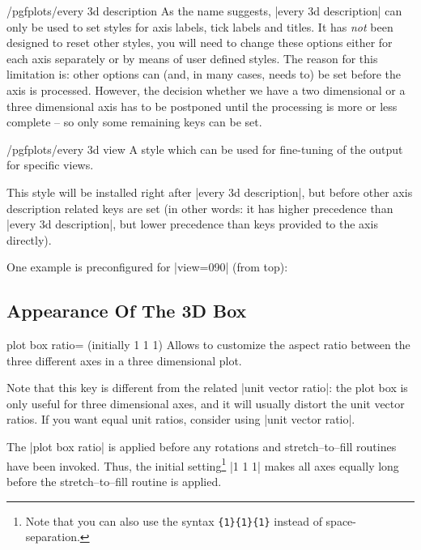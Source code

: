 {\begin{stylekey}{/pgfplots/every 3d description}
	As the name suggests, |every 3d description| can only be used to set styles for axis labels, tick labels and titles. It has \emph{not} been designed to reset other styles, you will need to change these options either for each axis separately or by means of user defined styles. The reason for this limitation is: other options can (and, in many cases, needs to) be set before the axis is processed. However, the decision whether we have a two dimensional or a three dimensional axis has to be postponed until the processing is more or less complete -- so only some remaining keys can be set.	
\end{stylekey}

\begin{stylekey}{/pgfplots/every 3d view }
	A style which can be used for fine-tuning of the output for specific views.

	This style will be installed right after |every 3d description|, but before other axis description related keys are set (in other words: it has higher precedence than |every 3d description|, but lower precedence than keys provided to the axis directly).

	One example is preconfigured for |view={0}{90}| (from top):
\begin{codeexample}
\end{codeexample}
\end{stylekey}


\subsection{Appearance Of The 3D Box}

\begin{pgfplotskey}{plot box ratio= (initially 1 1 1)}
	Allows to customize the aspect ratio between the three different axes in a three dimensional plot.

	Note that this key is different from the related |unit vector ratio|: the plot box is only useful for three dimensional axes, and it will usually distort the unit vector ratios. If you want equal unit ratios, consider using |unit vector ratio|.

	The |plot box ratio| is applied before any rotations and stretch--to--fill routines have been invoked. Thus, the initial setting\footnote{Note that you can also use the syntax \texttt{\{1\}\{1\}\{1\}} instead of space-separation.} |1 1 1| makes all axes equally long before the stretch--to--fill routine is applied.


\end{pgfplotskey}}
